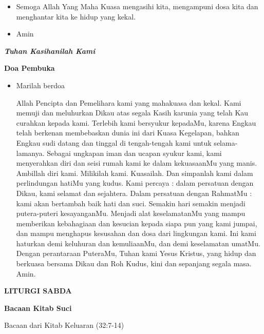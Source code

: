 \documentclass[12pt,twoside]{book}
\makeatletter
\newcommand{\judul}[1]{%
  {\parindent \z@ \centering \normalfont
    \interlinepenalty\@M \large \bfseries #1\par\nobreak \vskip 20\p@ }}
\newcommand{\subjudul}[1]{%
  {\parindent \z@ \normalfont
    \interlinepenalty\@M \bfseries #1\par\nobreak \vskip 20\p@ }}
\newcommand{\lagu}[1]{%
  {\parindent \z@ \normalfont
    \interlinepenalty\@M \bfseries \emph{#1}\par\nobreak \vskip 20\p@ }}
\newcommand{\BU}[1]{\begin{itemize} \item[U:] #1 \end{itemize}}
\newcommand{\BI}[1]{\begin{itemize} \item[I:] #1 \end{itemize}}
\makeatother
\begin{document}
\BI{Semoga Allah Yang Maha Kuasa mengasihi kita, mengampuni dosa kita dan menghantar kita ke hidup yang kekal.}

\BU{Amin}

\lagu{Tuhan Kasihanilah Kami}

\subjudul{Doa Pembuka}

\BI{Marilah berdoa

Allah Pencipta dan Pemelihara kami yang mahakuasa dan kekal. Kami memuji dan meluhurkan Dikau atas segala Kasih karunia yang telah Kau curahkan kepada kami. Terlebih kami bersyukur kepadaMu, karena Engkau telah berkenan membebaskan dunia ini dari Kuasa Kegelapan, bahkan Engkau sudi datang dan tinggal di tengah-tengah kami untuk selama-lamanya. Sebagai ungkapan iman dan ucapan syukur kami, kami menyerahkan diri dan seisi rumah kami ke dalam kekuasaanMu yang manis. Ambillah diri kami. Milikilah kami. Kuasailah. Dan simpanlah kami dalam perlindungan hatiMu yang kudus. Kami percaya : dalam persatuan dengan Dikau, kami selamat dan sejahtera. Dalam persatuan dengan RahmatMu : kami akan bertambah baik hati dan suci. Semakin hari semakin menjadi putera-puteri kesayanganMu. Menjadi alat keselamatanMu yang mampu memberikan kebahagiaan dan kesucian kepada siapa pun yang kami jumpai, dan mampu menghapus kesusahan dan dosa dari lingkungan kami. Ini kami haturkan demi keluhuran dan kemuliaanMu, dan demi keselamatan umatMu. Dengan perantaraan PuteraMu, Tuhan kami Yesus Kristus, yang hidup dan berkuasa bersama Dikau dan Roh Kudus, kini dan sepanjang segala masa.
Amin.}

\judul{LITURGI SABDA}

\subjudul{Bacaan Kitab Suci}

Bacaan dari Kitab Keluaran (32:7-14)
\end{document}
